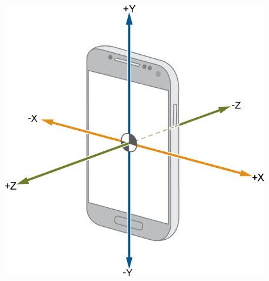 \documentclass[aspectratio=1610]{beamer}
\begin{document}
\begin{frame}
{\begin{columns}[onlytextwidth]
\begin{column}{.1\linewidth}
        \end{column}%
        \begin{column}{.01\linewidth}
        \end{column}%
        \begin{column}{.1\linewidth}
            \centering%
            \includegraphics[width=\linewidth]{img/accel.png}
        \end{column}%
        \begin{column}{.335\linewidth}%
        \end{column}%
    \end{columns}}%
    \begin{columns}[onlytextwidth]
        \begin{column}{.25\linewidth}
            \centering%
\end{column}
\end{columns}
\end{frame}
\end{document}
